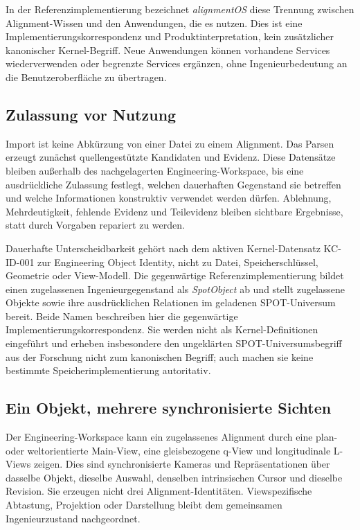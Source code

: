 In der Referenzimplementierung bezeichnet \emph{alignmentOS} diese Trennung
zwischen Alignment-Wissen und den Anwendungen, die es nutzen. Dies ist eine
Implementierungskorrespondenz und Produktinterpretation, kein zusätzlicher
kanonischer Kernel-Begriff. Neue Anwendungen können vorhandene Services
wiederverwenden oder begrenzte Services ergänzen, ohne Ingenieurbedeutung an
die Benutzeroberfläche zu übertragen.

\subsection{Zulassung vor Nutzung}

Import ist keine Abkürzung von einer Datei zu einem Alignment. Das Parsen
erzeugt zunächst quellengestützte Kandidaten und Evidenz. Diese Datensätze
bleiben außerhalb des nachgelagerten Engineering-Workspace, bis eine
ausdrückliche Zulassung festlegt, welchen dauerhaften Gegenstand sie betreffen
und welche Informationen konstruktiv verwendet werden dürfen. Ablehnung,
Mehrdeutigkeit, fehlende Evidenz und Teilevidenz bleiben sichtbare Ergebnisse,
statt durch Vorgaben repariert zu werden.

Dauerhafte Unterscheidbarkeit gehört nach dem aktiven Kernel-Datensatz
KC-ID-001 zur Engineering Object Identity, nicht zu Datei, Speicherschlüssel,
Geometrie oder View-Modell. Die gegenwärtige Referenzimplementierung bildet
einen zugelassenen Ingenieurgegenstand als \emph{SpotObject} ab und stellt
zugelassene Objekte sowie ihre ausdrücklichen Relationen im geladenen
SPOT-Universum bereit. Beide Namen beschreiben hier die gegenwärtige
Implementierungskorrespondenz. Sie werden nicht als Kernel-Definitionen
eingeführt und erheben insbesondere den ungeklärten SPOT-Universumsbegriff aus
der Forschung nicht zum kanonischen Begriff; auch machen sie keine bestimmte
Speicherimplementierung autoritativ.

\subsection{Ein Objekt, mehrere synchronisierte Sichten}

Der Engineering-Workspace kann ein zugelassenes Alignment durch eine plan-
oder weltorientierte Main-View, eine gleisbezogene q-View und longitudinale
L-Views zeigen. Dies sind synchronisierte Kameras und Repräsentationen über
dasselbe Objekt, dieselbe Auswahl, denselben intrinsischen Cursor und dieselbe
Revision. Sie erzeugen nicht drei Alignment-Identitäten. Viewspezifische
Abtastung, Projektion oder Darstellung bleibt dem gemeinsamen
Ingenieurzustand nachgeordnet.

